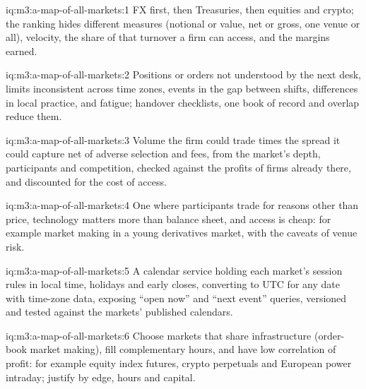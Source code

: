 \begin{solution}{iq:m3:a-map-of-all-markets:1}
FX first, then Treasuries, then equities and crypto; the ranking hides different measures (notional or value, net or gross, one venue or all),
velocity, the share of that turnover a firm can access, and the margins earned.
\end{solution}

\begin{solution}{iq:m3:a-map-of-all-markets:2}
Positions or orders not understood by the next desk, limits inconsistent across time zones, events in the gap between shifts, differences in local
practice, and fatigue; handover checklists, one book of record and overlap reduce them.
\end{solution}

\begin{solution}{iq:m3:a-map-of-all-markets:3}
Volume the firm could trade times the spread it could capture net of adverse selection and fees, from the market's depth, participants and competition,
checked against the profits of firms already there, and discounted for the cost of access.
\end{solution}

\begin{solution}{iq:m3:a-map-of-all-markets:4}
One where participants trade for reasons other than price, technology matters more than balance sheet, and access is cheap: for example market making
in a young derivatives market, with the caveats of venue risk.
\end{solution}

\begin{solution}{iq:m3:a-map-of-all-markets:5}
A calendar service holding each market's session rules in local time, holidays and early closes, converting to UTC for any date with time-zone data, exposing
``open now'' and ``next event'' queries, versioned and tested against the markets' published calendars.
\end{solution}

\begin{solution}{iq:m3:a-map-of-all-markets:6}
Choose markets that share infrastructure (order-book market making), fill complementary hours, and have low correlation of profit: for example equity index
futures, crypto perpetuals and European power intraday; justify by edge, hours and capital.
\end{solution}

